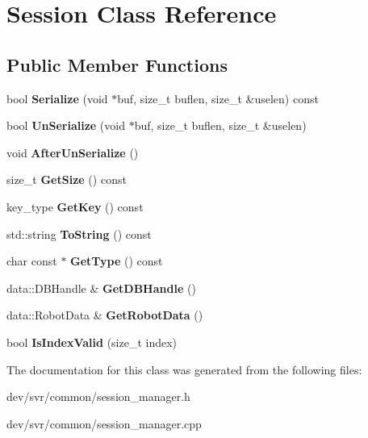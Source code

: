 \hypertarget{classSession}{
\section{Session Class Reference}
\label{classSession}
}
\subsection*{Public Member Functions}
\begin{DoxyCompactItemize}
\item 
\hypertarget{classSession_ad3139ef121a0122172f22487a088153f}{
bool {\bfseries Serialize} (void $\ast$buf, size\_\-t buflen, size\_\-t \&uselen) const }
\label{classSession_ad3139ef121a0122172f22487a088153f}

\item 
\hypertarget{classSession_a49d17f978e4a2e79612d49a325eb06b8}{
bool {\bfseries UnSerialize} (void $\ast$buf, size\_\-t buflen, size\_\-t \&uselen)}
\label{classSession_a49d17f978e4a2e79612d49a325eb06b8}

\item 
\hypertarget{classSession_abf68a14ed79bf7302ad4d34f6bc7b14d}{
void {\bfseries AfterUnSerialize} ()}
\label{classSession_abf68a14ed79bf7302ad4d34f6bc7b14d}

\item 
\hypertarget{classSession_a8e289f9bb6ec00452749bf2af9d7fe67}{
size\_\-t {\bfseries GetSize} () const }
\label{classSession_a8e289f9bb6ec00452749bf2af9d7fe67}

\item 
\hypertarget{classSession_a00988747b3edc6257ccdd1130a18e1d5}{
key\_\-type {\bfseries GetKey} () const }
\label{classSession_a00988747b3edc6257ccdd1130a18e1d5}

\item 
\hypertarget{classSession_a6d0295a47d4a82fbed73723f5940665e}{
std::string {\bfseries ToString} () const }
\label{classSession_a6d0295a47d4a82fbed73723f5940665e}

\item 
\hypertarget{classSession_a4c4d09bea41e184fa153bc97f5582326}{
char const $\ast$ {\bfseries GetType} () const }
\label{classSession_a4c4d09bea41e184fa153bc97f5582326}

\item 
\hypertarget{classSession_a715604bd46487623a62c50f92c36794d}{
data::DBHandle \& {\bfseries GetDBHandle} ()}
\label{classSession_a715604bd46487623a62c50f92c36794d}

\item 
\hypertarget{classSession_adcaaa409b954d0b9480be390012d6b88}{
data::RobotData \& {\bfseries GetRobotData} ()}
\label{classSession_adcaaa409b954d0b9480be390012d6b88}

\item 
\hypertarget{classSession_aab8a6f4e66e81ae46298dbcf47be3603}{
bool {\bfseries IsIndexValid} (size\_\-t index)}
\label{classSession_aab8a6f4e66e81ae46298dbcf47be3603}

\end{DoxyCompactItemize}


The documentation for this class was generated from the following files:\begin{DoxyCompactItemize}
\item 
dev/svr/common/session\_\-manager.h\item 
dev/svr/common/session\_\-manager.cpp\end{DoxyCompactItemize}
